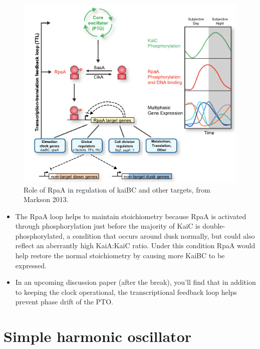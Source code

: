 \documentclass{article}
\begin{document}
\begin{figure}
\begin{center}
\includegraphics[width=\textwidth]{rpa.png}
\caption{Role of RpaA in regulation of kaiBC and other targets, from Markson 2013.}
\end{center}
\end{figure}

\begin{itemize}
\item The RpaA loop helps to maintain stoichiometry because RpaA is activated through phosphorylation just before the majority of KaiC is double-phosphorylated, a condition that occurs around dusk normally, but could also reflect an aberrantly high KaiA:KaiC ratio. Under this condition RpaA would help restore the normal stoichiometry by causing more KaiBC to be expressed.
\item In an upcoming discussion paper (after the break), you'll find that in addition to keeping the clock operational, the transcriptional feedback loop helps prevent phase drift of the PTO.

\end{itemize}

\section*{Simple harmonic oscillator}
\end{document}
